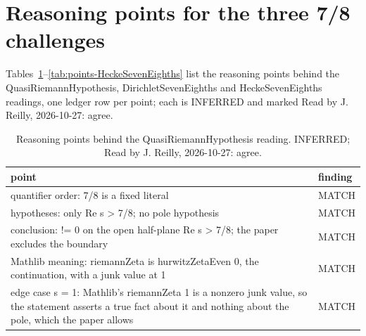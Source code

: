 \section{Reasoning points for the three 7/8 challenges}\label{app:reasoning}

Tables~\ref{tab:points-QuasiRiemannHypothesis}--\ref{tab:points-HeckeSevenEighths} list the reasoning points behind the QuasiRiemannHypothesis, DirichletSevenEighths and HeckeSevenEighths readings, one ledger row per point; each is INFERRED and marked Read by J. Reilly, 2026-10-27: agree.

\begin{table}[!htbp]
\caption{Reasoning points behind the QuasiRiemannHypothesis reading. INFERRED; Read by J. Reilly, 2026-10-27: agree.}\label{tab:points-QuasiRiemannHypothesis}
\scriptsize\setlength{\tabcolsep}{3pt}\renewcommand{\arraystretch}{0.95}
\begin{tabularx}{\textwidth}{@{}>{\raggedright\arraybackslash}Xl@{}}
\toprule
point & finding \\
\midrule
quantifier order: 7/8 is a fixed literal & MATCH \\
hypotheses: only Re s > 7/8; no pole hypothesis & MATCH \\
conclusion: != 0 on the open half-plane Re s > 7/8; the paper excludes the boundary & MATCH \\
Mathlib meaning: riemannZeta is hurwitzZetaEven 0, the continuation, with a junk value at 1 & MATCH \\
edge case s = 1: Mathlib's riemannZeta 1 is a nonzero junk value, so the statement asserts a true fact about it and nothing about the pole, which the paper allows & MATCH \\
\bottomrule
\end{tabularx}
\end{table}


